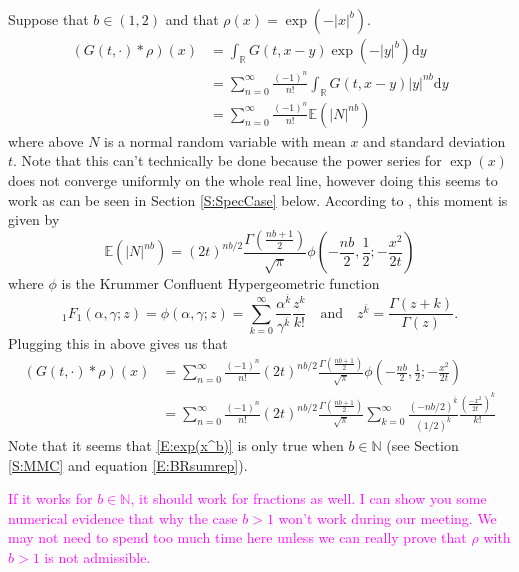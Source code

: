 \documentclass{article}
\numberwithin{equation}{section}
\newcommand{\R}{\mathbb{R}}
\newcommand{\ud}{\ensuremath{\mathrm{d}}}
\begin{document}
Suppose that $b\in (1,2)$ and that $\rho(x) = \exp(-|x|^b)$.
\begin{align*}
(G(t,\cdot) * \rho)(x) &= \int_{\R} G(t,x-y)\exp(-|y|^b) \ud y
\\&= \sum_{n=0}^\infty \frac{(-1)^n}{n!} \int_{\R} G(t,x-y) |y|^{nb} \ud y
\\& = \sum_{n=0}^\infty \frac{(-1)^n}{n!} \mathbb{E}(|N|^{nb})
\end{align*}
where above $N$ is a normal random variable with mean $x$ and standard deviation $t$. Note that this can't technically be done because the power series for $\exp(x)$ does not converge uniformly on the whole real line, however doing this seems to work as can be seen in Section \ref{S:SpecCase} below. According to \cite{Winklebauer}, this moment is given by
\[
\mathbb{E}(|N|^{nb}) = (2t)^{nb/2} \frac{\Gamma\left(\frac{nb+1}{2}\right)}{\sqrt{\pi}} \phi\left( -\frac{nb}{2}, \frac{1}{2} ; - \frac{x^2}{2t} \right)
\]
where $\phi$ is the Krummer Confluent Hypergeometric function
\[
_1F_1(\alpha,\gamma;z) = \phi(\alpha,\gamma;z) = \sum_{k=0}^\infty \frac{\alpha^{\bar{k}}}{\gamma^{\bar{k}}} \frac{ z^k }{ k! } \quad \text{and} \quad z^{\bar{k}} = \frac{ \Gamma(z+k) }{ \Gamma(z) }.
\]
Plugging this in above gives us that
\begin{align}\label{E:exp(x^b)}
(G(t,\cdot) * \rho)(x) &= \sum_{n=0}^\infty \frac{(-1)^n}{n!}(2t)^{nb/2} \frac{\Gamma\left(\frac{nb+1}{2}\right)}{\sqrt{\pi}} \phi\left( -\frac{nb}{2}, \frac{1}{2} ; - \frac{x^2}{2t} \right)
\\&= \sum_{n=0}^\infty \frac{(-1)^n}{n!} (2t)^{nb/2} \frac{\Gamma\left(\frac{nb+1}{2}\right)}{\sqrt{\pi}} \sum_{k=0}^\infty \frac{(-nb/2)^{\bar{k}}}{(1/2)^{\bar{k}}} \frac{ (\frac{-x^2}{2t})^k }{ k! }
\end{align}
Note that it seems that \eqref{E:exp(x^b)} is only true when $b \in \mathbb{N}$ (see Section \ref{S:MMC} and equation \eqref{E:BRsumrep}).

\bigskip

\textcolor{magenta}{If it works for $b\in \mathbb{N}$, it should work for fractions as well. I can
show you some numerical evidence that why the case $b>1$ won't work during our meeting. We may not
need to spend too much time here unless we can really prove that $\rho$ with $b>1$ is not
admissible.}
\end{document}

